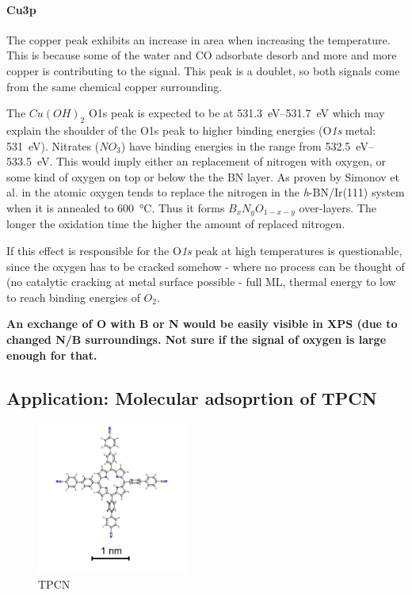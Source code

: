 \paragraph{Cu3p}
The copper peak exhibits an increase in area when increasing the temperature. This is because some of the water and CO adsorbate desorb and more and more copper is contributing to the signal. This peak is a doublet, so both signals come from the same chemical copper surrounding.


The $Cu(OH)_2$ O1s peak is expected to be at \SIrange{531.3}{531.7}{\eV}\cite{deroubaix_x-ray_1992} which may explain the shoulder of the O1s peak to higher binding energies (O\textit{1s} metal: \SI{531}{\eV}). Nitrates ($NO_3$) have binding energies in the range from \SIrange{532.5}{533.5}{\eV}\cite[45]{wanger_handbook_1979}. This would imply either an replacement of nitrogen with oxygen, or some kind of oxygen on top or below the the BN layer. As proven by Simonov et al. in \cite{simonov_controllable_2012} the atomic oxygen tends to replace the nitrogen in the \textit{h}-BN/Ir(111) system when it is annealed to \SI{600}{\degreeCelsius}. Thus it forms $B_{x}N_{y}O_{1-x-y}$ over-layers. The longer the oxidation time the higher the amount of replaced nitrogen. 

If this effect is responsible for the O\textit{1s} peak at high temperatures is questionable, since the oxygen has to be cracked somehow - where no process can be thought of (no catalytic cracking at metal surface possible - full ML, thermal energy to low to reach binding energies of $O_2$.

\textbf{An exchange of O with B or N would be easily visible in XPS (due to changed N/B surroundings. Not sure if the signal of oxygen is large enough for that.}

\subsection{Application: Molecular adsoprtion of TPCN}
\label{sec:foil-use-case}

\begin{figure}\centering
	\includegraphics[width=5cm]{./images/molecules/TPCN-scalebar}
	\caption{TPCN}
	\label{fig:TPCN-scalebar}
\end{figure}

